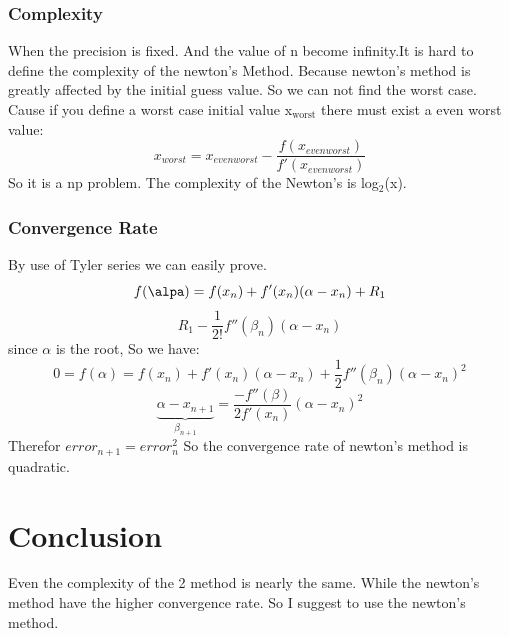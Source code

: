 \documentclass[setspace, doublespace]{scrartcl}
\begin{document}
\subsubsection{Complexity}
\label{sec:orgd0fedc3}
When the precision is fixed. And the value of n become infinity.It is hard to
define the complexity of the newton's Method. Because newton's method is
greatly affected by the initial guess value. So we can not find the worst
case. Cause if you define a worst case initial value x\(_{\text{worst}}\) there must exist
a even worst value:
$$ x_{worst} = x_{evenworst} - \frac{f(x_{evenworst})}{f'(x_{evenworst})} $$
So it is a np problem. The complexity of the Newton's is log\(_{\text{2}}\)(x).
\subsubsection{Convergence Rate}
\label{sec:org17d1b81}
By use of Tyler series we can easily prove.
$$f(\alpa) = f(x_n) + f'(x_n)(\alpha - x_n) + R_1$$
$$R_1 - \frac{1}{2!}f''(\beta_n)(\alpha - x_n)$$
since \(\alpha\) is the root, So we have:
$$0=f(\alpha) = f(x_n) + f'(x_n)(\alpha - x_n) +
    \frac{1}{2}f''(\beta_n)(\alpha - x_n)^2$$
$$\underbrace{\alpha-x_{n+1}}_{\beta_{n+1}} =
    \frac{-f''(\beta)}{2f'(x_n)}(\alpha-x_n)^2$$
Therefor \(error_{n+1} = error_n^2\)
So the convergence rate of newton's method is quadratic.
\section{Conclusion}
\label{sec:org2189a49}
Even the complexity of the 2 method is nearly the same. While the newton's
method have the higher convergence rate. So I suggest to use the newton's
method.
\end{document}
